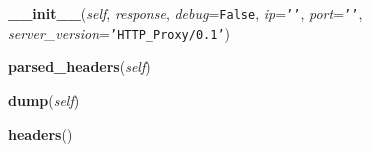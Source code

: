 \hspace{.8\funcindent}\begin{boxedminipage}{\funcwidth}

    \raggedright \textbf{\_\_init\_\_}(\textit{self}, \textit{response}, \textit{debug}={\tt False}, \textit{ip}={\tt \texttt{'}\texttt{}\texttt{'}}, \textit{port}={\tt \texttt{'}\texttt{}\texttt{'}}, \textit{server\_version}={\tt \texttt{'}\texttt{HTTP\_Proxy/0.1}\texttt{'}})

\setlength{\parskip}{2ex}
\setlength{\parskip}{1ex}
    \end{boxedminipage}

    \label{Headers:ServerHeaders:parsed_headers}

    \vspace{0.5ex}

\hspace{.8\funcindent}\begin{boxedminipage}{\funcwidth}

    \raggedright \textbf{parsed\_headers}(\textit{self})

\setlength{\parskip}{2ex}
\setlength{\parskip}{1ex}
    \end{boxedminipage}

    \label{Headers:ServerHeaders:dump}

    \vspace{0.5ex}

\hspace{.8\funcindent}\begin{boxedminipage}{\funcwidth}

    \raggedright \textbf{dump}(\textit{self})

\setlength{\parskip}{2ex}
\setlength{\parskip}{1ex}
    \end{boxedminipage}

    \label{Headers:ServerHeaders:headers}

    \vspace{0.5ex}

\hspace{.8\funcindent}\begin{boxedminipage}{\funcwidth}

    \raggedright \textbf{headers}()

\setlength{\parskip}{2ex}
\setlength{\parskip}{1ex}
    \end{boxedminipage}


